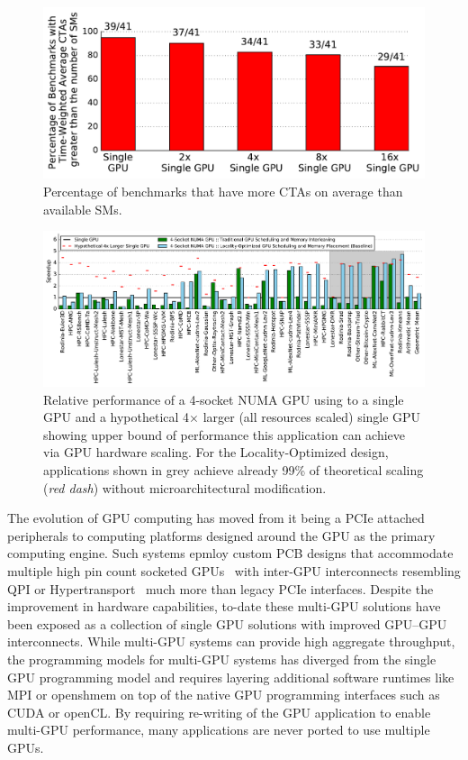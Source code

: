 \begin{figure}[t] 
    \centering
    \includegraphics[width=1.0\columnwidth]{figures/plot_ctas_per_sm.pdf}
    \caption{Percentage of benchmarks that have more CTAs on average than available SMs.}
    \label{fig:ctas}
\end{figure}

\begin{figure}[tp] 
    \centering
    \includegraphics[width=1.0\linewidth]{figures/plot_different_baselines.pdf}
    \caption{Relative performance of a 4-socket NUMA GPU using to a single GPU 
and a hypothetical 4$\times$ larger (all resources scaled) single GPU showing 
upper bound of performance this application can achieve via GPU hardware 
scaling. For the Locality-Optimized design, applications shown in grey 
achieve already 99\% of theoretical scaling (\emph{red dash}) without 
microarchitectural modification.}
    \label{fig:motivation}
\end{figure}

The evolution of GPU computing has moved from it being a PCIe attached peripherals 
to computing platforms designed around the GPU as the primary computing engine. 
Such systems epmloy custom PCB designs that accommodate multiple high pin count socketed 
GPUs~\cite{DGX} with inter-GPU interconnects resembling QPI or 
Hypertransport~\cite{INTELQPI,AMDHT} much more than legacy PCIe interfaces.  
Despite the improvement in hardware capabilities, to-date these multi-GPU 
solutions have been exposed as a collection of single GPU solutions with improved GPU--GPU 
interconnects. While multi-GPU systems can provide high aggregate throughput, 
the programming models for multi-GPU systems has diverged from the single GPU 
programming model and requires layering additional software runtimes like MPI 
or openshmem on top of the native GPU programming interfaces such as CUDA or openCL.
By requiring re-writing of the GPU application to enable multi-GPU performance, 
many applications are never ported to use multiple GPUs.

